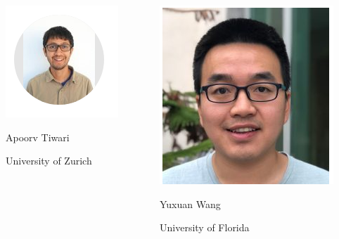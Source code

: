 \documentclass{beamer}
\renewcommand{\(}{\left(}
\renewcommand{\)}{\right)}
\renewcommand{\[}{\left[}
\renewcommand{\]}{\right]}
\begin{document}
\begin{frame}
    \centering
    \begin{columns}
        \begin{column}{0.5\textwidth}
            \centering
            \includegraphics[trim= 0 20 0 20,clip]{Screenshot_20200516_213116.png}

            Apoorv Tiwari
            
            University of Zurich
        \end{column}
        \begin{column}{0.5\textwidth}
            \centering
            \includegraphics[scale=0.4]{YWSC.png}

            Yuxuan Wang 

            University of Florida
        \end{column}
    \end{columns}
\end{frame}
\end{document}
